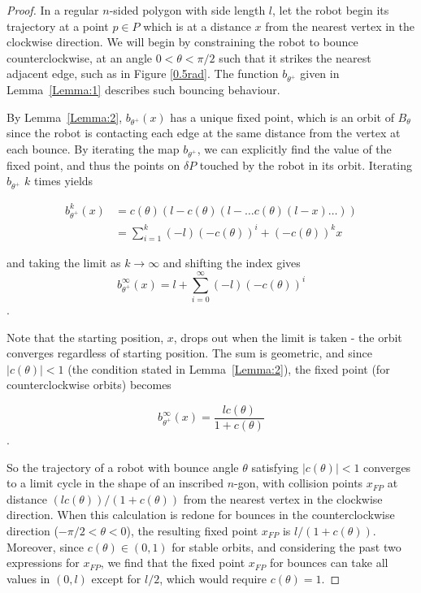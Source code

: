 \documentclass[letterpaper, 10 pt, conference]{ieeeconf}  %
\begin{document}
\begin{proof}
In a regular $n$-sided polygon with side length $l$, let the robot begin its
trajectory at a point $p \in P$ which is at a distance $x$ from the nearest
vertex in the clockwise direction. We will begin by constraining the robot to
bounce counterclockwise, at an angle $0 < \theta < \pi/2$ 
such that it strikes the nearest
adjacent edge, such as in Figure \ref{0.5rad}. The function $b_{\theta^+}$ 
given in Lemma~\ref{Lemma:1} describes such bouncing behaviour.

By Lemma~\ref{Lemma:2}, $b_{\theta^+}(x)$ has a unique fixed point, which is
an orbit of $B_\theta$ since the
robot is contacting each edge at the same distance from the
vertex at each bounce. By iterating the map $b_{\theta^+}$,
we can explicitly find the value of
the fixed point, and thus the points on $\delta P$ touched by the
robot in its orbit. Iterating $b_{\theta^+}$ $k$ times yields

\begin{align*}
b_{\theta^+}^k(x) & = c(\theta) (l-c(\theta)(l- \ldots c(\theta)(l-x) \ldots )) \\
                & = \sum_{i=1}^{k} (-l) (-c(\theta))^i + (-c(\theta))^kx 
\end{align*}

\noindent and taking the limit as $k \to \infty$ and shifting the index gives
\begin{equation*}
b_{\theta^+}^\infty(x) = l + \sum\limits_{i=0}^\infty (-l)(-c(\theta))^i
\end{equation*}
.

Note that the starting position, $x$, drops out when the limit
is taken - the orbit converges regardless of
starting position. The sum is geometric, and since $|c(\theta)| < 1$ 
(the condition stated in Lemma~\ref{Lemma:2}), the fixed point 
(for counterclockwise orbits) becomes

\begin{equation*}
b_{\theta^+}^\infty(x) = \frac{lc(\theta)}{1+c(\theta)}
\end{equation*}
.

So the trajectory of a robot with bounce angle $\theta$ satisfying
$|c(\theta)| < 1$ converges to a limit cycle in the shape of an inscribed
$n$-gon, with collision points $x_{FP}$ at distance $(lc(\theta))/(1+c(\theta))$
from the nearest vertex in the clockwise direction. When this calculation is
redone for bounces in the counterclockwise direction ($-\pi/2 < \theta < 0$), the resulting fixed point
$x_{FP}$ is $l/(1 + c(\theta))$. Moreover, since $c(\theta) \in (0, 1)$ 
for stable orbits, and considering the past two
expressions for $x_{FP}$, we find that the fixed point $x_{FP}$ for bounces can
take all values in $(0, l)$ except for $l/2$, which would require
$c(\theta) = 1$.


\end{proof}
\end{document}
